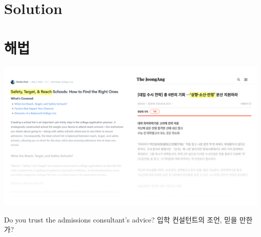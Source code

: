 \documentclass[11pt,mathserif,notheorems]{beamer}
\theoremstyle{definition}
\theoremstyle{definition}
\begin{document}
\ifen \section{Solution} \else \section{해법} \fi






\begin{frame}%

\begin{center}
\includegraphics[width=\textwidth]{plots/news-both.png}

\ifen Do you trust the admissions consultant's advice?
\else 입학 컨설턴트의 조언, 믿을 만한가? \fi
\end{center}

\end{frame}
\end{document}
